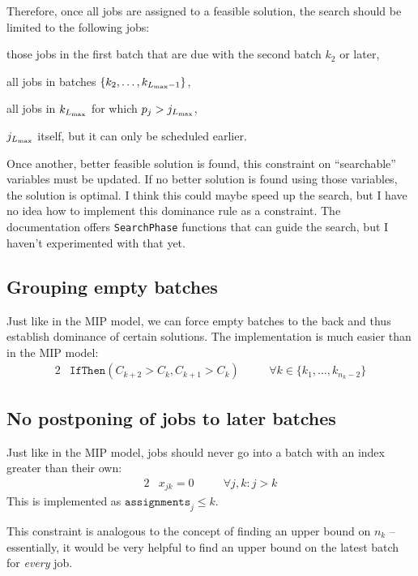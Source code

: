 Therefore, once all jobs are assigned to a feasible solution, the search should be limited
to the following jobs:
\begin{alist}
\item{those jobs in the first batch that are due with the second batch $k_2$ or
later,}
\item{all jobs in batches $\{k_2, \dots, k_{L_{\text{max}}-1}\}$,}
\item{all jobs in $k_{L_{\text{max}}}$ for which $p_j > j_{L_{\text{max}}}$,}
\item{$j_{L_{\text{max}}}$ itself, but it can only be scheduled earlier.}
\end{alist}

Once another, better feasible solution is found, this constraint on
``searchable'' variables must be updated. If no better solution is found using
those variables, the solution is optimal. {\color{darkred} I think this could
maybe speed up the search, but I have no idea how to implement this dominance
rule as a constraint. The documentation offers \texttt{SearchPhase} functions
that can guide the search, but I haven't experimented with that yet.}

\subsection{Grouping empty batches}
Just like in the MIP model, we can force empty batches to the back and thus
establish dominance of certain solutions. The implementation is much easier than
in the MIP model:
\begin{alignat}{2}
& \mathtt{IfThen}( C_{k+2} > C_{k}, C_{k+1} > C_{k} ) \quad && \forall k \in
\{k_1, \dots, k_{n_k-2}\}
\end{alignat}

\subsection{No postponing of jobs to later batches}
Just like in the MIP model, jobs should never go into a batch with an index
greater than their own:
\begin{alignat}{2}
  & x_{jk} = 0 \quad && \forall j,k : j > k
\end{alignat}
This is implemented as $\mathtt{assignments}_j \leq k$. 

{\color{darkred} This constraint is analogous to the concept of finding an upper
bound on $n_k$ -- essentially, it would be very helpful to find an upper bound
on the latest batch for \textit{every} job.}


